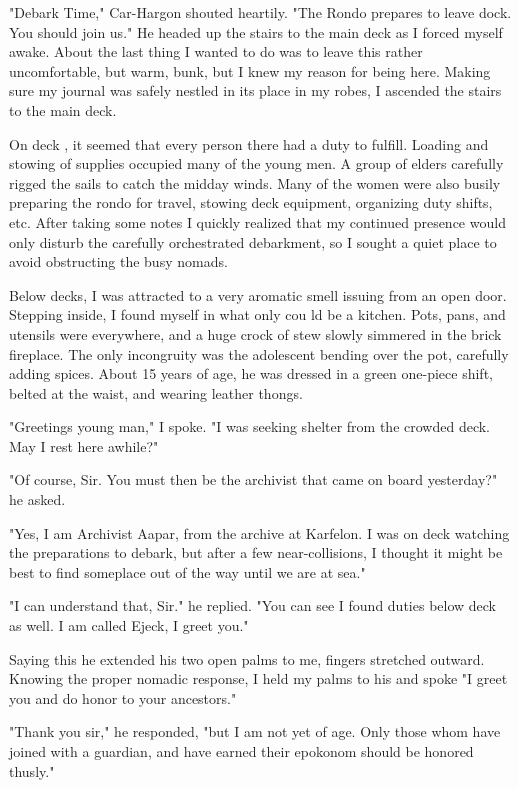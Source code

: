 "Debark Time," Car-Hargon shouted heartily. "The Rondo prepares to leave dock. You should join us." He headed up the stairs to the main deck as I forced myself
awake. About the last thing I wanted to do was to leave this rather uncomfortable, but warm, bunk, but I knew my reason for being here. Making sure my journal was safely nestled in its place in my robes, I ascended the stairs to the main deck.

On deck , it seemed that every person there had a duty to fulfill. Loading and stowing of supplies occupied many of the young men. A group of elders carefully rigged the sails to catch the midday winds. Many of the women were also busily preparing the rondo for travel, stowing deck equipment, organizing duty shifts, etc. After taking some notes I quickly realized that my continued presence would only disturb the carefully orchestrated debarkment, so I sought a quiet place to avoid obstructing the busy nomads.

Below decks, I was attracted to a very aromatic smell issuing from an open door. Stepping inside, I found myself in what only cou ld be a kitchen. Pots, pans, and utensils were everywhere, and a huge crock of stew slowly simmered in the brick fireplace. The only incongruity was the adolescent bending over the pot, carefully adding spices. About 15 years of age, he was dressed in a green one-piece shift, belted at the waist, and wearing leather thongs.

"Greetings young man," I spoke. "I was seeking shelter from the crowded deck. May I rest here awhile?"

"Of course, Sir. You must then be the archivist that came on board yesterday?" he asked.

"Yes, I am Archivist Aapar, from the archive at Karfelon. I was on deck watching the preparations to debark, but after a few near-collisions, I thought it might be best to find someplace out of the way until we are at sea."

"I can understand that, Sir." he replied. "You can see I found duties below deck as well. I am called Ejeck, I greet you."

Saying this he extended his two open palms to me, fingers stretched outward. Knowing the proper nomadic response, I held my palms to his and spoke "I greet you and
do honor to your ancestors."

"Thank you sir," he responded, "but I am not yet of age. Only those whom have joined with a guardian, and have earned their epokonom should be honored thusly."

